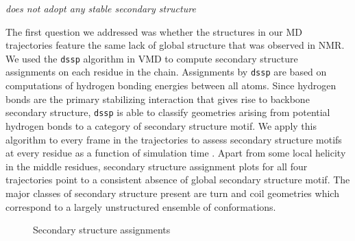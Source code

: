 {\it \gct{} does not adopt any stable secondary structure}

The first question we addressed was whether the structures in our MD trajectories feature the same lack of global structure that was observed in NMR. We used the \texttt{dssp} algorithm  in VMD to compute secondary structure assignments on each residue in the chain. Assignments by \texttt{dssp} are based on computations of hydrogen bonding energies between all atoms. Since hydrogen bonds are the primary stabilizing interaction that gives rise to backbone secondary structure, \texttt{dssp} is able to classify geometries arising from potential hydrogen bonds to a category of secondary structure motif. We apply this algorithm to every frame in the trajectories to assess secondary structure motifs at every residue as a function of simulation time . Apart from some local helicity in the middle residues, secondary structure assignment plots for all four trajectories point to a consistent absence of global secondary structure motif. The major classes of secondary structure present are turn and coil geometries which correspond to a largely unstructured ensemble of conformations. 

\begin{figure}
	\centering     %
	\caption{Secondary structure assignments}
\end{figure}	

